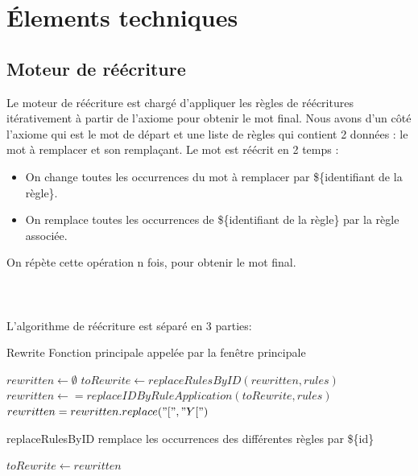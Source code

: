 \chapter{Élements techniques}

\section{Moteur de réécriture}

Le moteur de réécriture est chargé d'appliquer les règles de réécritures itérativement à partir de l'axiome pour obtenir le mot final.
Nous avons d'un côté l'axiome qui est le mot de départ et une liste de règles qui contient 2 données : le mot à remplacer et son remplaçant.
Le mot est réécrit en 2 temps :\\
\begin{itemize}
    \item On change toutes les occurrences du mot à remplacer par \$\{identifiant de la règle\}.
    \item On remplace toutes les occurrences de \$\{identifiant de la règle\} par la règle associée.
\end{itemize}
On répète cette opération n fois, pour obtenir le mot final.\\
\\
\\
\\
L'algorithme de réécriture est séparé en 3 parties:\\

\begin{algorithm}
\DontPrintSemicolon
\KwIn{axiom: $String$, rules : $List[Tuple[String, String]$, recurrence: $Integer$}
\caption{Rewrite Fonction principale appelée par la fenêtre principale}
$rewritten \gets \emptyset$\;
 {
    $toRewrite \gets replaceRulesByID(rewritten, rules)$\;
    $rewritten \gets = replaceIDByRuleApplication(toRewrite, rules)$\;
}
$rewritten = rewritten.replace("[", "Y[")$\;
\;
\end{algorithm}
\newpage
\begin{algorithm}
\DontPrintSemicolon
\KwIn{rewritten: $String$, rules : $List[Tuple[String, String]$}
\caption{replaceRulesByID remplace les occurrences des différentes règles par \$\{id\}}
$toRewrite \gets rewritten$\;

\end{algorithm}

